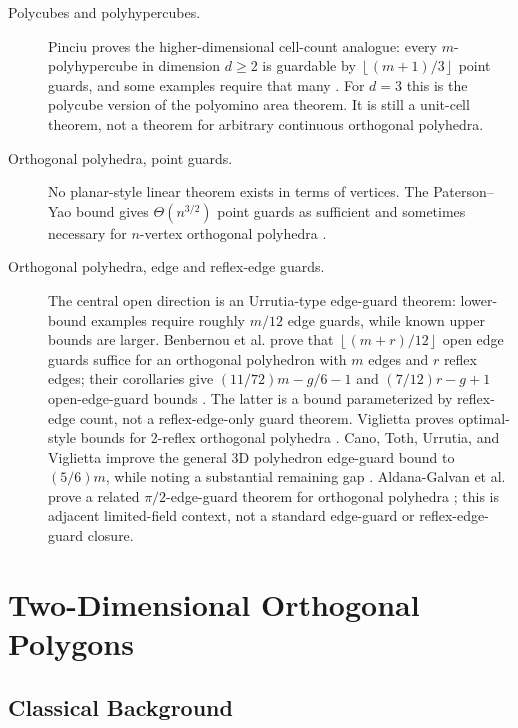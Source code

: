\documentclass[11pt]{article}
\newcommand{\floor}[1]{\left\lfloor #1 \right\rfloor}
\begin{document}
\begin{description}
  \item[Polycubes and polyhypercubes.]
  Pinciu proves the higher-dimensional cell-count analogue: every
  $m$-polyhypercube in dimension $d\geq 2$ is guardable by
  $\floor{(m+1)/3}$ point guards, and some examples require that many
  \cite{Pinciu2015}.  For $d=3$ this is the polycube version of the
  polyomino area theorem.  It is still a unit-cell theorem, not a theorem for
  arbitrary continuous orthogonal polyhedra.

  \item[Orthogonal polyhedra, point guards.]
  No planar-style linear theorem exists in terms of vertices.  The Paterson--Yao
  bound gives $\Theta(n^{3/2})$ point guards as sufficient and sometimes
  necessary for $n$-vertex orthogonal polyhedra \cite{PatersonYao1992,VigliettaThesis}.

  \item[Orthogonal polyhedra, edge and reflex-edge guards.]
  The central open direction is an Urrutia-type edge-guard theorem:
  lower-bound examples require roughly $m/12$ edge guards, while known upper
  bounds are larger.  Benbernou et al. prove that $\floor{(m+r)/12}$ open
  edge guards suffice for an orthogonal polyhedron with $m$ edges and $r$
  reflex edges; their corollaries give $(11/72)m-g/6-1$ and
  $(7/12)r-g+1$ open-edge-guard bounds
  \cite[Theorem~5 and Corollaries~6--7]{BenbernouEtAl2011}.  The latter is a
  bound parameterized by reflex-edge count, not a reflex-edge-only guard
  theorem.  Viglietta proves optimal-style bounds for
  2-reflex orthogonal polyhedra \cite{Viglietta2020}.  Cano, Toth, Urrutia,
  and Viglietta improve the general 3D polyhedron edge-guard bound to
  $(5/6)m$, while noting a substantial remaining gap
  \cite{CanoTothUrrutiaViglietta2022}.  Aldana-Galvan et al. prove a related
  $\pi/2$-edge-guard theorem for orthogonal polyhedra
  \cite{AldanaGalvanEtAl2016}; this is adjacent limited-field context, not a
  standard edge-guard or reflex-edge-guard closure.
\end{description}

\section{Two-Dimensional Orthogonal Polygons}

\subsection{Classical Background}
\end{document}
